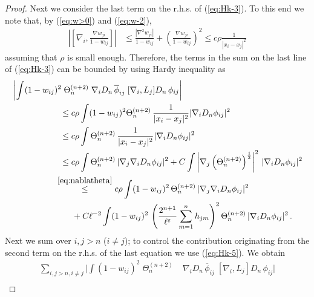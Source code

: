 \documentclass[11pt]{article}
\newcommand{\eps}{\varepsilon}
\begin{document}
\begin{proof}
Next we consider the last term on the r.h.s. of (\ref{eq:Hk-3}). To
this end we note that,  by (\ref{eq:w>0}) and (\ref{eq:w-2}),
\begin{equation*}
\begin{split}
\left| \left[\nabla_i, \frac{\nabla w_{ji}}{1-w_{ij}} \right]
\right| &\leq \frac{\left| \nabla^2 w_{ji} \right|}{1-w_{ij}} +
\left( \frac{ \nabla w_{ji}}{1-w_{ij}} \right)^2 \leq c \rho
\frac{1}{|x_i - x_j|^2}
\end{split}
\end{equation*}
assuming that $\rho$ is small enough. Therefore, the terms in
the sum on the last line of (\ref{eq:Hk-3}) can be bounded by using
Hardy inequality as
\begin{equation}
\begin{split}
&\left|\int (1-w_{ij})^2 \; \Theta^{(n+2)}_n \; \nabla_i D_n
\,\overline{\phi}_{ij} \; [\nabla_i, L_j ] D_n \, \phi_{ij} \right|
\\ &\hspace{2cm}\leq c \rho \int (1-w_{ij})^2
\Theta^{(n+2)}_n \, \frac{1}{|x_i - x_j|^2} |\nabla_i D_n \phi_{ij}|^2\\
&\hspace{2cm}\leq c \rho \int \Theta^{(n+2)}_n \, \frac{1}{|x_i
- x_j|^2} |\nabla_i D_n \phi_{ij}|^2 \\
&\hspace{2cm}\leq c \rho \int  \Theta^{(n+2)}_n \,|\nabla_j \nabla_i
D_n \phi_{ij}|^2 +C \int \left|\nabla_j
\left(\Theta^{(n+2)}_n\right)^{\frac{1}{2}} \right|^2 \,|\nabla_i
D_n \phi_{ij}|^2
\\&\hspace{1.8cm}  \stackrel{\eqref{eq:nablatheta}} {\leq}
 c \rho \int (1-w_{ij})^2 \,
\Theta^{(n+2)}_n \,|\nabla_j \nabla_i D_n \phi_{ij}|^2
\\ &\hspace{2.5cm}
+C \ell^{-2} \int (1-w_{ij})^2 \, \left(
\frac{2^{n+1}}{\ell^{\eps}} \sum_{m=1}^n h_{jm}\right)^2
\Theta^{(n+2)}_n \, |\nabla_i D_n \phi_{ij}|^2 \, .
\end{split}
\end{equation}
Next we sum over $i,j >n$ ($i \neq j$); to control the contribution
originating from the second term on the r.h.s. of the last equation
we use (\ref{eq:Hk-5}). We obtain
\begin{equation}\label{eq:Hk-8}
\begin{split}
\sum_{i,j >n, i \neq j} \Big|\int (1-w_{ij})^2 \; \Theta^{(n+2)}_n
&\; \nabla_i D_n \,\overline{\phi}_{ij} \;
[\nabla_i, L_j ] D_n \, \phi_{ij} \Big| \\

\end{split}
\end{equation}
\end{proof}
\end{document}
